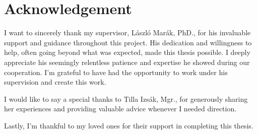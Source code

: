 \documentclass[a4paper,oneside,onecolumn,12pt]{book}
\begin{document}
\section*{Acknowledgement}
\thispagestyle{empty}
I want to sincerely thank my supervisor, László Marák, PhD., for his invaluable support and guidance throughout this project. His dedication and willingness to help, often going beyond what was expected, made this thesis possible. I deeply appreciate his seemingly relentless patience and expertise he showed during our cooperation. I'm grateful to have had the opportunity to work under his supervision and create this work.

I would like to say a special thanks to Tilla Izsák, Mgr., for generously sharing her experiences and providing valuable advice whenever I needed direction.

Lastly, I'm thankful to my loved ones for their support in completing this thesis.
\pagebreak

\newcommand{\chpt}[1]{\section*{#1}}


\end{document}

